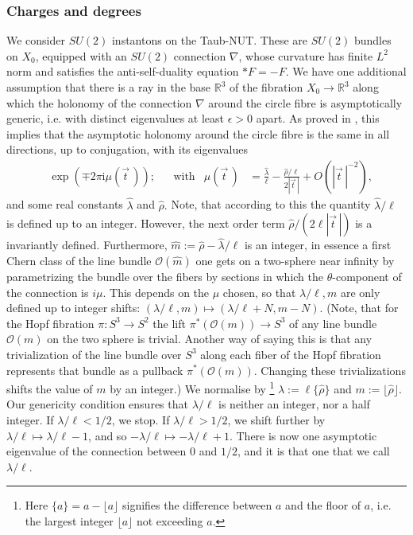 \documentclass[12pt]{article}
\theoremstyle{definition}
\theoremstyle{remark}
\numberwithin{theorem}{section}
\renewcommand{\i}{\mathrm{i}}
\def\pO{{\mathcal O}}
\begin{document}
\subsubsection{Charges and degrees}

We consider $SU(2)$ instantons on the Taub-NUT. These are $SU(2)$ bundles on $X_0$, equipped with  an  $SU(2)$ connection $\nabla$, whose curvature has finite $L^2$ norm and  satisfies the anti-self-duality equation $*F=-F$. We have one additional assumption that there is a ray in the base $\mathbb{R}^3$ of the fibration $X_0\rightarrow\mathbb{R}^3$ along which the holonomy of the connection $\nabla$ around the circle fibre is asymptotically generic, i.e. with distinct eigenvalues at least $\epsilon>0$ apart.  As proved in \cite[Thm.22]{Cherkis:2016gmo}, this implies that the asymptotic holonomy around the circle fibre is the same in all directions, up to conjugation, with its eigenvalues
\begin{align}
&\exp\left(\mp 2\pi\i\mu(\vec{t}\,) \right);&
&\text{with}&
\mu(\vec{t}\,) &=\frac{\hat{\lambda} }{\ell}-\frac{\hat{\rho}/\ell}{2|\vec{t}\,|}+O(|\vec{t}\,|^{-2}),
\end{align}
and some real constants $\hat{\lambda}$ and $\hat{\rho}.$ 
Note, that according to this the quantity $\hat\lambda/\ell$ is defined up to an integer.  
However, the next order term $\hat{\rho}/(2\ell{|\vec{t}\,|})$ is a invariantly defined.     Furthermore, $\hat{m}:=\hat{\rho}- \hat{\lambda} /\ell$ is an integer, in essence a first Chern class of the line bundle $\pO(\hat{m})$ one gets on a two-sphere near infinity by parametrizing the bundle over the fibers by sections in which the $\theta$-component of the connection is $i\mu$. This depends on the $\mu$ chosen, so that $\lambda/\ell, m$ are only defined up to integer shifts:
  $(\lambda/\ell, m)\mapsto (\lambda/\ell +N, m -N)$.
  (Note, that for the Hopf fibration $\pi:S^3\rightarrow S^2$ the lift $\pi^*(\mathcal{O}(m))\rightarrow S^3$ of any line bundle $\mathcal{O}(m)$ on the two sphere is trivial. Another way of saying this is that any trivialization of the line bundle over $S^3$ along each fiber of the Hopf fibration represents that bundle as a pullback $\pi^*(\mathcal{O}(m)).$ 
Changing these trivializations shifts the value of $m$ by an integer.)
% 
We normalise by \footnote{
Here $\{a\}=a-\lfloor a\rfloor$ signifies the difference between $a$ and the floor of $a$, i.e. 
the largest integer $\lfloor a\rfloor$ not exceeding $a$.} 
$\lambda :=\ell\{\hat{\rho} \}$ and $m :=\lfloor\hat{\rho}\rfloor.$  Our genericity condition ensures that   $\lambda/\ell$ is neither an integer, nor a half integer. If $\lambda/\ell<1/2$, we stop. If $\lambda/\ell>1/2$, we shift further by $\lambda/\ell\mapsto \lambda/\ell-1$, and so $-\lambda/\ell\mapsto -\lambda/\ell +1$. There is now one asymptotic eigenvalue of the connection between $0$ and $1/2$, and it is that one that we call $\lambda/\ell$.
  
\end{document}
